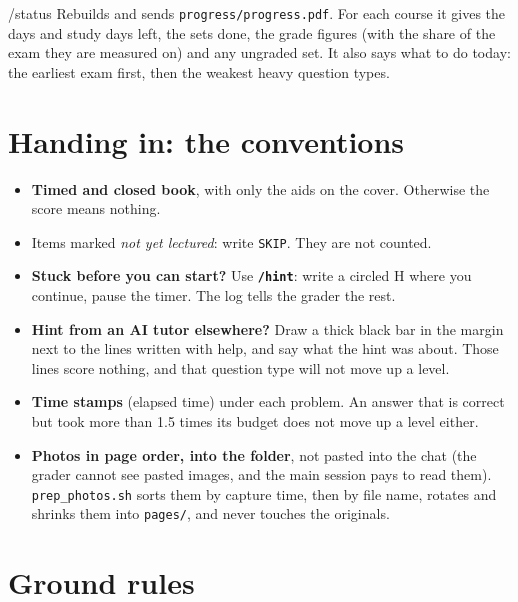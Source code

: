 \documentclass[a4paper,10pt]{article}
\newcommand{\cmd}[1]{\texttt{\bfseries #1}}
\begin{document}
\begin{card}{/status}
Rebuilds and sends \texttt{progress/progress.pdf}. For each course it gives the days and study
days left, the sets done, the grade figures (with the share of the exam they are measured on)
and any ungraded set. It also says what to do today: the earliest exam first, then the weakest
heavy question types.
\end{card}

\section{Handing in: the conventions}

\begin{note}
\begin{itemize}
  \item \textbf{Timed and closed book}, with only the aids on the cover. Otherwise the score means nothing.
  \item Items marked \emph{not yet lectured}: write \texttt{SKIP}. They are not counted.
  \item \textbf{Stuck before you can start?} Use \cmd{/hint}: write a circled H where you continue, pause
    the timer. The log tells the grader the rest.
  \item \textbf{Hint from an AI tutor elsewhere?} Draw a thick black bar in the margin next to the lines
    written with help, and say what the hint was about. Those lines score nothing, and that
    question type will not move up a level.
  \item \textbf{Time stamps} (elapsed time) under each problem. An answer that is correct but took
    more than 1.5 times its budget does not move up a level either.
  \item \textbf{Photos in page order, into the folder}, not pasted into the chat (the grader cannot see
    pasted images, and the main session pays to read them). \texttt{prep\_photos.sh} sorts them by
    capture time, then by file name, rotates and shrinks them into \texttt{pages/}, and never
    touches the originals.
\end{itemize}
\end{note}

\section{Ground rules}
\end{document}
